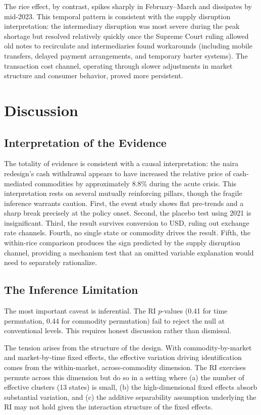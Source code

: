 \documentclass[12pt]{article}
\begin{document}
The rice effect, by contrast, spikes sharply in February--March and dissipates by mid-2023. This temporal pattern is consistent with the supply disruption interpretation: the intermediary disruption was most severe during the peak shortage but resolved relatively quickly once the Supreme Court ruling allowed old notes to recirculate and intermediaries found workarounds (including mobile transfers, delayed payment arrangements, and temporary barter systems). The transaction cost channel, operating through slower adjustments in market structure and consumer behavior, proved more persistent.


\section{Discussion}
\label{sec:discussion}

\subsection{Interpretation of the Evidence}

The totality of evidence is consistent with a causal interpretation: the naira redesign's cash withdrawal appears to have increased the relative price of cash-mediated commodities by approximately 8.8\% during the acute crisis. This interpretation rests on several mutually reinforcing pillars, though the fragile inference warrants caution. First, the event study shows flat pre-trends and a sharp break precisely at the policy onset. Second, the placebo test using 2021 is insignificant. Third, the result survives conversion to USD, ruling out exchange rate channels. Fourth, no single state or commodity drives the result. Fifth, the within-rice comparison produces the sign predicted by the supply disruption channel, providing a mechanism test that an omitted variable explanation would need to separately rationalize.

\subsection{The Inference Limitation}

The most important caveat is inferential. The RI $p$-values (0.41 for time permutation, 0.44 for commodity permutation) fail to reject the null at conventional levels. This requires honest discussion rather than dismissal.

The tension arises from the structure of the design. With commodity-by-market and market-by-time fixed effects, the effective variation driving identification comes from the within-market, across-commodity dimension. The RI exercises permute across this dimension but do so in a setting where (a) the number of effective clusters (13 states) is small, (b) the high-dimensional fixed effects absorb substantial variation, and (c) the additive separability assumption underlying the RI may not hold given the interaction structure of the fixed effects.
\end{document}

